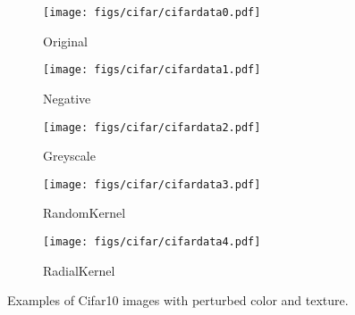 \documentclass{article}
\begin{document}
\begin{figure}[h!]
  \centering
    \begin{subfigure}{.19\textwidth}
      \centering
      \texttt{[image: figs/cifar/cifardata0.pdf]}
      \caption{Original}
    \end{subfigure}
    \begin{subfigure}{.19\textwidth}
      \centering
      \texttt{[image: figs/cifar/cifardata1.pdf]}
      \caption{Negative}
    \end{subfigure}
    \begin{subfigure}{.19\textwidth}
      \centering
      \texttt{[image: figs/cifar/cifardata2.pdf]}
      \caption{Greyscale}
    \end{subfigure}
    \begin{subfigure}{.19\textwidth}
      \centering
      \texttt{[image: figs/cifar/cifardata3.pdf]}
      \caption{RandomKernel}
    \end{subfigure}
    \begin{subfigure}{.19\textwidth}
      \centering
      \texttt{[image: figs/cifar/cifardata4.pdf]}
      \caption{RadialKernel}
    \end{subfigure}
\caption{Examples of Cifar10 images with perturbed color and texture.}
\label{fig:cifardata}
\end{figure}

\clearpage
\end{document}
